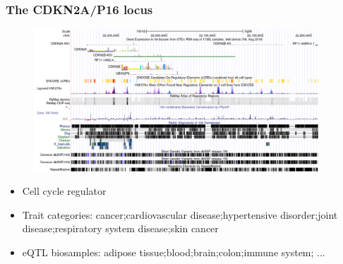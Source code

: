 \documentclass{beamer}
\begin{document}
    \begin{frame}
        \frametitle{The CDKN2A/P16 locus}

        \begin{figure}[!]
            \includegraphics[width=0.95\textwidth]{fig/cdk2na}
        \end{figure}

        \begin{itemize}
            \item Cell cycle regulator
            \item Trait categories: cancer;cardiovascular disease;hypertensive disorder;joint disease;respiratory system disease;skin cancer
            \item eQTL biosamples: adipose tissue;blood;brain;colon;immune system; ...
        \end{itemize}

    \end{frame}
\end{document}
